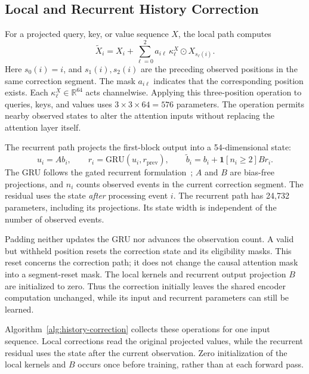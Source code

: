 \documentclass[runningheads]{llncs}
\begin{document}
\subsection{Local and Recurrent History Correction}
For a projected query, key, or value sequence $X$, the local path computes
\begin{equation}
 \widetilde X_i=X_i+\sum_{\ell=0}^{2}a_{i\ell}\,\kappa^X_\ell\odot X_{s_\ell(i)}.
 \label{eq:local}
\end{equation}
Here $s_0(i)=i$, and $s_1(i),s_2(i)$ are the preceding observed positions in the same correction segment. The mask $a_{i\ell}$ indicates that the corresponding position exists. Each $\kappa^X_\ell\in\mathbb{R}^{64}$ acts channelwise. Applying this three-position operation to queries, keys, and values uses $3\times3\times64=576$ parameters. The operation permits nearby observed states to alter the attention inputs without replacing the attention layer itself.

The recurrent path projects the first-block output into a 54-dimensional state:
\begin{equation}
 u_i=A b_i,\qquad r_i=\mathrm{GRU}(u_i,r_{\mathrm{prev}}),\qquad
 \widetilde b_i=b_i+\mathbf{1}[n_i\geq2]B r_i.
 \label{eq:recurrent}
\end{equation}
The GRU follows the gated recurrent formulation~\cite{cho2014gru}; $A$ and $B$ are bias-free projections, and $n_i$ counts observed events in the current correction segment. The residual uses the state \emph{after} processing event $i$. The recurrent path has 24,732 parameters, including its projections. Its state width is independent of the number of observed events.

Padding neither updates the GRU nor advances the observation count. A valid but withheld position resets the correction state and its eligibility masks. This reset concerns the correction path; it does not change the causal attention mask into a segment-reset mask. The local kernels and recurrent output projection $B$ are initialized to zero. Thus the correction initially leaves the shared encoder computation unchanged, while its input and recurrent parameters can still be learned.

Algorithm~\ref{alg:history-correction} collects these operations for one input sequence. Local corrections read the original projected values, while the recurrent residual uses the state after the current observation. Zero initialization of the local kernels and $B$ occurs once before training, rather than at each forward pass.
\end{document}
